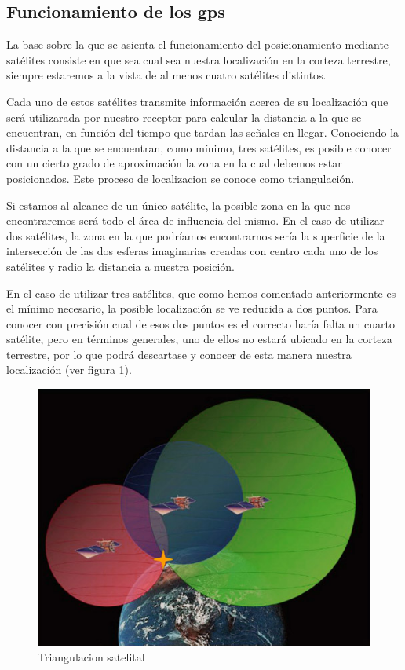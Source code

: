 \subsection{Funcionamiento de los gps}

La base sobre la que se asienta el funcionamiento del posicionamiento mediante satélites consiste en que sea cual sea nuestra localización en la corteza terrestre, siempre estaremos a la vista de al menos cuatro satélites distintos.

Cada uno de estos satélites transmite información acerca de su localización que será utilizarada por nuestro receptor para calcular la distancia a la que se encuentran, en función del tiempo que tardan las señales en llegar.
Conociendo la distancia a la que se encuentran, como mínimo, tres satélites, es posible conocer con un cierto grado de aproximación la zona en la cual debemos estar posicionados. Este proceso de localizacion se conoce como triangulación.

Si estamos al alcance de un único satélite, la posible zona en la que nos encontraremos será todo el área de influencia del mismo. En el caso de utilizar dos satélites, la zona en la que podríamos encontrarnos sería la superficie de la intersección de las dos esferas imaginarias creadas con centro cada uno de los satélites y radio la distancia a nuestra posición.

En el caso de utilizar tres satélites, que como hemos comentado anteriormente es el mínimo necesario, la posible localización se ve reducida a dos puntos. Para conocer con precisión cual de esos dos puntos es el correcto haría falta un cuarto satélite, pero en términos generales, uno de ellos no estará ubicado en la corteza terrestre, por lo que podrá descartase y conocer de esta manera nuestra localización (ver figura \ref{fig:triangulacion-satelital}).

\begin{figure}[h!btp]
\centering
\includegraphics[scale=0.5, fbox={\fboxrule} 0mm]{images/03-antecedentes/31-funcionamiento_gps.jpg}
\caption{Triangulacion satelital}
\label{fig:triangulacion-satelital}
\end{figure}

